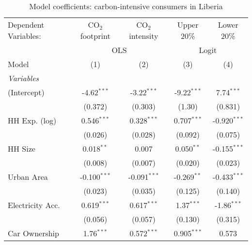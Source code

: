 
\begin{table}[htbp!]
   \centering
   \small
   \begin{adjustbox}{width = 1\textwidth, max height = 0.95\textheight, center}
      \begin{threeparttable}[b]
         \caption{\label{tab:Logit_1_LBR} Model coefficients: carbon-intensive consumers in Liberia}
         \begin{tabular}{lcccc}
            \tabularnewline \midrule \midrule
            Dependent Variables: & CO$_{2}$ footprint & CO$_{2}$ intensity & Upper 20\%    & Lower 20\%\\   
             & \multicolumn{2}{c}{OLS} & \multicolumn{2}{c}{Logit} \\ 
            Model                & (1)                & (2)                & (3)           & (4)\\  
            \midrule
            \emph{Variables}\\
            (Intercept)          & -4.62$^{***}$      & -3.22$^{***}$      & -9.22$^{***}$ & 7.74$^{***}$\\   
                                 & (0.372)            & (0.303)            & (1.30)        & (0.831)\\   
            HH Exp. (log)        & 0.546$^{***}$      & 0.328$^{***}$      & 0.707$^{***}$ & -0.920$^{***}$\\   
                                 & (0.026)            & (0.028)            & (0.092)       & (0.075)\\   
            HH Size              & 0.018$^{**}$       & 0.007              & 0.050$^{**}$  & -0.155$^{***}$\\   
                                 & (0.008)            & (0.007)            & (0.020)       & (0.023)\\   
            Urban Area           & -0.100$^{***}$     & -0.091$^{***}$     & -0.269$^{**}$ & -0.433$^{***}$\\   
                                 & (0.023)            & (0.035)            & (0.125)       & (0.140)\\   
            Electricity Acc.     & 0.619$^{***}$      & 0.617$^{***}$      & 1.37$^{***}$  & -1.86$^{***}$\\   
                                 & (0.056)            & (0.057)            & (0.130)       & (0.315)\\   
            Car Ownership        & 1.76$^{***}$       & 0.572$^{***}$      & 0.905$^{***}$ & 0.573\\   

\end{tabular}
\end{threeparttable}
\end{adjustbox}
\end{table}
